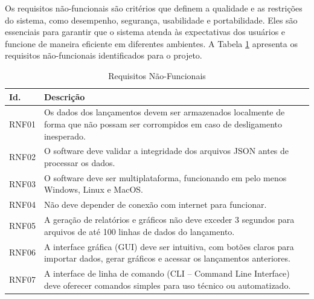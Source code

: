 \begin{samepage}
Os requisitos não-funcionais são critérios que definem a qualidade e as restrições do sistema, como desempenho, segurança, usabilidade e portabilidade. Eles são essenciais para garantir que o sistema atenda às expectativas dos usuários e funcione de maneira eficiente em diferentes ambientes. A Tabela \ref{tab:requisitos_nao_funcionais} apresenta os requisitos não-funcionais identificados para o projeto.

\begin{table}[H]
\centering
\scriptsize
\setlength{\tabcolsep}{4pt}
\caption{Requisitos Não-Funcionais}
\begin{tabular}{|l|p{11cm}|}
\hline
Id. & Descrição \\
\hline
RNF01 & Os dados dos lançamentos devem ser armazenados localmente de forma que não possam ser corrompidos em caso de desligamento inesperado. \\
\hline
RNF02 & O software deve validar a integridade dos arquivos JSON antes de processar os dados. \\
\hline
RNF03 & O software deve ser multiplataforma, funcionando em pelo menos Windows, Linux e MacOS. \\
\hline
RNF04 & Não deve depender de conexão com internet para funcionar. \\
\hline
RNF05 & A geração de relatórios e gráficos não deve exceder 3 segundos para arquivos de até 100 linhas de dados do lançamento. \\
\hline
RNF06 & A interface gráfica (GUI) deve ser intuitiva, com botões claros para importar dados, gerar gráficos e acessar os lançamentos anteriores. \\
\hline
RNF07 & A interface de linha de comando (CLI – Command Line Interface) deve oferecer comandos simples para uso técnico ou automatizado. \\
\hline
\end{tabular}
\label{tab:requisitos_nao_funcionais}
\end{table}
\end{samepage}


